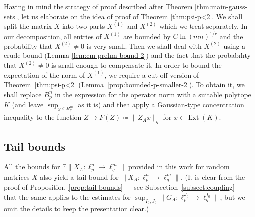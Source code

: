 \documentclass[a4paper]{amsart}
\theoremstyle{definition}
\theoremstyle{remark}
\numberwithin{equation}{section}
\newcommand*{\EE}{\mathbb{E}}
\newcommand*{\Ext}{\operatorname{Ext}} %
\begin{document}
Having in mind the strategy of proof described after Theorem \ref{thm:main-gauss-sets}, let us elaborate on the idea of proof of Theorem \ref{thm:psi-p<2}. We shall split the matrix $X$ into two parts $X^{(1)}$ and $X^{(2)}$ which we treat separately. In our decomposition, all entries of $X^{(1)}$ are bounded by $C\ln(mn)^{1/r}$ and the probability that $X^{(2)} \neq 0$ is very small. Then we shall deal with $X^{(2)}$ using a crude bound (Lemma \ref{lem:cm-prelim-bound-2}) and the fact that the probability that $X^{(2)} \neq 0$ is small enough to compensate it. In order to bound the expectation of the norm of $X^{(1)}$, we require a cut-off version of Theorem~\ref{thm:psi-p<2} (Lemma~\ref{prop:bounded-p-smaller-2}). To obtain it, we shall replace $B_p^n$ in the expression for the operator norm with a suitable polytope $K$ (and leave $\sup_{y\in B_{q^*}^m}$ as it is) and then apply a Gaussian-type concentration inequality to the function
$Z\mapsto F(Z) \coloneqq \|Z_A x\|_q$ for $x\in \Ext (K)$.


%
\subsection{Tail bounds}
%

All the bounds for $\EE\|X_A\colon \ell_p^n \to \ell_q^m\|$ provided in this work for random matrices $X$
also yield a tail bound for $\|X_A\colon \ell_p^n \to \ell_q^m\|$.
(It is clear from the proof of Proposition~\ref{prop:tail-bounds} --- see Subsection~\ref{subsect:coupling} --- that the same applies to the estimates for $\sup_{I_0, J_0} \|G_A: \ell_p^{J_0} \to \ell_q^{I_0} \| $, but we omit the details to keep the presentation clear.)
\end{document}
